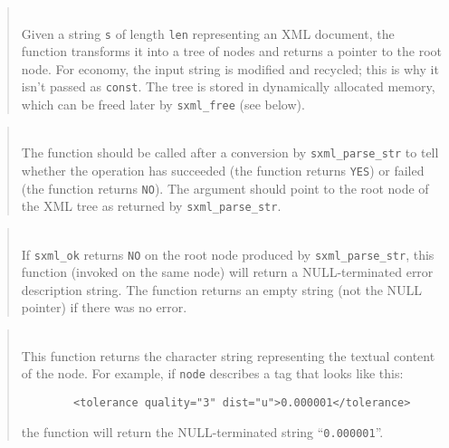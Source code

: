 \begin{quote}
\noindent\hspace{-0.35in}{\tt sxml\_t sxml\_parse\_str (char *s, size\_t len); }\\ \hspace{0in}
Given a string {\tt s} of length {\tt len}
representing an XML document,
the function transforms it into a tree of nodes and returns
a pointer to the root node.
For economy, the input string is modified and recycled; this is why
it isn't passed as {\tt const}.
The tree is stored in dynamically allocated memory, which can be freed later
by {\tt sxml\_free} (see below).
\end{quote}

\begin{quote}
\noindent\hspace{-0.35in}{\tt int sxml\_ok (sxml\_t node); }\\ \hspace{0in}
The function should be called after a conversion by 
{\tt sxml\_parse\_str}
to tell whether the operation has succeeded (the function returns {\tt YES})
or failed (the function returns {\tt NO}).
The argument should point to the root node of the XML tree as returned by
{\tt sxml\_parse\_str}.
\end{quote}

\begin{quote}
\noindent\hspace{-0.35in}{\tt const char *sxml\_error
(sxml\_t node); }\\ \hspace{0in}
If {\tt sxml\_ok} returns {\tt NO} on the root node produced by
{\tt sxml\_parse\_str}, this function (invoked on the same node) will
return a NULL-terminated error description string.
The function returns an empty string (not the NULL pointer)
if there was no error.
\end{quote}

\begin{quote}
\noindent\hspace{-0.35in}{\tt char *sxml\_txt (sxml\_t node); }\\ \hspace{0in}
This function returns the character string representing the textual content
of the node.
For example, if {\tt node} describes a tag that looks like this:
\begin{verbatim}
        <tolerance quality="3" dist="u">0.000001</tolerance>
\end{verbatim}
\noindent
the function will return the NULL-terminated string ``{\tt 0.000001}''.
\end{quote}

